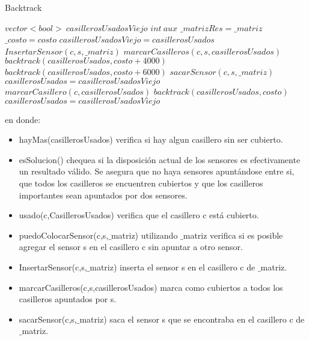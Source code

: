 \begin{algorithm}[H]
\caption{Backtrack}\label{Backtrack}
\begin{algorithmic}[1]
	\State $vector<bool>\ casillerosUsadosViejo$ 
	\State $int\ aux$
			\State $\_matrizRes=\_matriz$ 
			\State $\_costo=costo $ 
		\EndIf
	\Else
			\State $casillerosUsadosViejo = casillerosUsados$ 
							\State $InsertarSensor(c,s,\_matriz)$ 
							\State $marcarCasilleros(c,s,casillerosUsados)$
								\State $backtrack(casillerosUsados,costo+4000)$
							\Else
								\State $backtrack(casillerosUsados,costo+6000)$
							\EndIf
							\State $sacarSensor(c,s,\_matriz)$ 
							\State $casillerosUsados=casillerosUsadosViejo$
						\EndIf
					\EndFor
					\State $marcarCasillero(c,casillerosUsados)$
					\State $backtrack(casillerosUsados,costo)$
					\State $casillerosUsados=casillerosUsadosViejo$
				\EndIf
			\EndFor
		\EndIf
	\EndIf	
\EndProcedure
\end{algorithmic}
\end{algorithm}

en donde:

\begin{itemize}
	\item hayMas(casillerosUsados) verifica si hay algun casillero sin ser cubierto.
	\item esSolucion() chequea si la disposición actual de los sensores es efectivamente un resultado válido. Se asegura que no haya sensores apuntándose entre si, que todos los casilleros se encuentren cubiertos y que los casilleros importantes sean apuntados por dos sensores.
	\item usado(c,CasillerosUsados) verifica que el casillero c está cubierto.
	\item puedoColocarSensor(c,s,$\_$matriz) utilizando $\_$matriz verifica si es posible agregar el sensor s en el casillero c sin apuntar a otro sensor.
	\item InsertarSensor(c,s,$\_$matriz) inserta el sensor s en el casillero c de $\_$matriz.
	\item marcarCasilleros(c,s,casillerosUsados) marca como cubiertos a todos los casilleros apuntados por s.
	\item sacarSensor(c,s,$\_$matriz) saca el sensor s que se encontraba en el casillero c de $\_$matriz.
\end{itemize}
